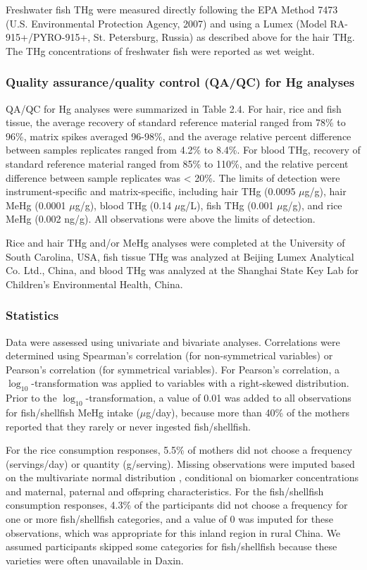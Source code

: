 Freshwater fish THg were measured directly following the EPA Method 7473 (U.S. Environmental Protection Agency, 2007) and using a Lumex (Model RA-915+/PYRO-915+, St. Petersburg, Russia) as described above for the hair THg. The THg concentrations of freshwater fish were reported as wet weight. 

\subsubsection{Quality assurance/quality control (QA/QC) for Hg analyses}

QA/QC for Hg analyses were summarized in Table 2.4. For hair, rice and fish tissue, the average recovery of standard reference material ranged from 78\% to 96\%, matrix spikes averaged 96-98\%, and the average relative percent difference between samples replicates ranged from 4.2\% to 8.4\%. For blood THg, recovery of standard reference material ranged from 85\% to 110\%, and the relative percent difference between sample replicates was < 20\%. The limits of detection were instrument-specific and matrix-specific, including hair THg (0.0095 \({\mu}\)g/g), hair MeHg (0.0001 \({\mu}\)g/g), blood THg (0.14 \({\mu}\)g/L), fish THg (0.001 \({\mu}\)g/g), and rice MeHg (0.002 ng/g). All observations were above the limits of detection.

Rice and hair THg and/or MeHg analyses were completed at the University of South Carolina, USA, fish tissue THg was analyzed at Beijing Lumex Analytical Co. Ltd., China, and blood THg was analyzed at the Shanghai State Key Lab for Children's Environmental Health, China.

\subsubsection{Statistics}

Data were assessed using univariate and bivariate analyses. Correlations were determined using Spearman's correlation (for non-symmetrical variables) or Pearson's correlation (for symmetrical variables). For Pearson's correlation, a $\log_{10}$-transformation was applied to variables with a right-skewed distribution. Prior to the $\log_{10}$-transformation, a value of 0.01 was added to all observations for fish/shellfish MeHg intake (\({\mu}\)g/day), because more than 40\% of the mothers reported that they rarely or never ingested fish/shellfish. 

For the rice consumption responses, 5.5\% of mothers did not choose a frequency (servings/day) or quantity (g/serving). Missing observations were imputed based on the multivariate normal distribution \citep{schafer1997analysis}, conditional on biomarker concentrations and maternal, paternal and offspring characteristics. For the fish/shellfish consumption responses, 4.3\% of the participants did not choose a frequency for one or more fish/shellfish categories, and a value of 0 was imputed for these observations, which was appropriate for this inland region in rural China. We assumed participants skipped some categories for fish/shellfish because these varieties were often unavailable in Daxin. 

